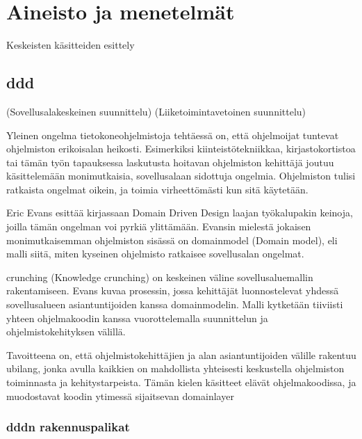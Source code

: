 \vspace{21.5pt}

\hypertarget{aineisto-ja-menetelmuxe4t}{%
\chapter{Aineisto ja menetelmät}\label{aineisto-ja-menetelmuxe4t}}

Keskeisten käsitteiden esittely

\hypertarget{section}{%
\section{\texorpdfstring{\gls{ddd}}{}}\label{section}}

(Sovellusalakeskeinen suunnittelu) (Liiketoimintavetoinen suunnittelu)

Yleinen ongelma tietokoneohjelmistoja tehtäessä on, että ohjelmoijat
tuntevat ohjelmiston erikoisalan heikosti. Esimerkiksi
kiinteistötekniikkaa, kirjastokortistoa tai tämän työn tapauksessa
laskutusta hoitavan ohjelmiston kehittäjä joutuu käsittelemään
monimutkaisia, sovellusalaan sidottuja ongelmia. Ohjelmiston tulisi
ratkaista ongelmat oikein, ja toimia virheettömästi kun sitä käytetään.

Eric Evans esittää kirjassaan Domain Driven Design laajan työkalupakin
keinoja, joilla tämän ongelman voi pyrkiä ylittämään. Evansin mielestä
jokaisen monimutkaisemman ohjelmiston sisässä on \gls{domainmodel}
(Domain model), eli malli siitä, miten kyseinen ohjelmisto ratkaisee
sovellusalan ongelmat.

\Gls{crunching} (Knowledge crunching) on keskeinen väline
sovellusaluemallin rakentamiseen. Evans kuvaa prosessin, jossa
kehittäjät luonnostelevat yhdessä sovellusalueen asiantuntijoiden kanssa
\gls{domainmodel}in. Malli kytketään tiiviisti yhteen ohjelmakoodin
kanssa vuorottelemalla suunnittelun ja ohjelmistokehityksen välillä.
\cite[s. 13]{evans:ddd}

Tavoitteena on, että ohjelmistokehittäjien ja alan asiantuntijoiden
välille rakentuu \gls{ubilang}, jonka avulla kaikkien on mahdollista
yhteisesti keskustella ohjelmiston toiminnasta ja kehitystarpeista.
Tämän kielen käsitteet elävät ohjelmakoodissa, ja muodostavat koodin
ytimessä sijaitsevan \gls{domainlayer}

\hypertarget{n-rakennuspalikat}{%
\subsection{\texorpdfstring{\gls{ddd}n
rakennuspalikat}{n rakennuspalikat}}\label{n-rakennuspalikat}}

